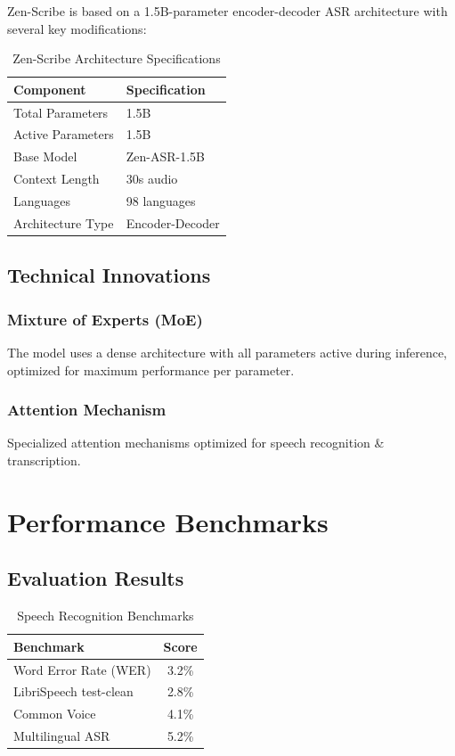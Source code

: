 \documentclass[11pt,a4paper]{article}
\begin{document}
Zen-Scribe is based on a 1.5B-parameter encoder-decoder ASR architecture with several key modifications:

\begin{table}[H]
\centering
\begin{tabular}{ll}
\toprule
\textbf{Component} & \textbf{Specification} \\
\midrule
Total Parameters & 1.5B \\
Active Parameters & 1.5B \\
Base Model & Zen-ASR-1.5B \\
Context Length & 30s audio \\

Languages & 98 languages \\
Architecture Type & Encoder-Decoder \\
\bottomrule
\end{tabular}
\caption{Zen-Scribe Architecture Specifications}
\end{table}

\subsection{Technical Innovations}

\subsubsection{Mixture of Experts (MoE)}
The model uses a dense architecture with all parameters active during inference, optimized for maximum performance per parameter.

\subsubsection{Attention Mechanism}
Specialized attention mechanisms optimized for speech recognition \& transcription.

\section{Performance Benchmarks}

\subsection{Evaluation Results}

\begin{table}[H]
\centering
\begin{tabular}{lc}
\toprule
\textbf{Benchmark} & \textbf{Score} \\
\midrule
Word Error Rate (WER) & 3.2\% \\
LibriSpeech test-clean & 2.8\% \\
Common Voice & 4.1\% \\
Multilingual ASR & 5.2\% \\
\bottomrule
\end{tabular}
\caption{Speech Recognition Benchmarks}
\end{table}
\end{document}
